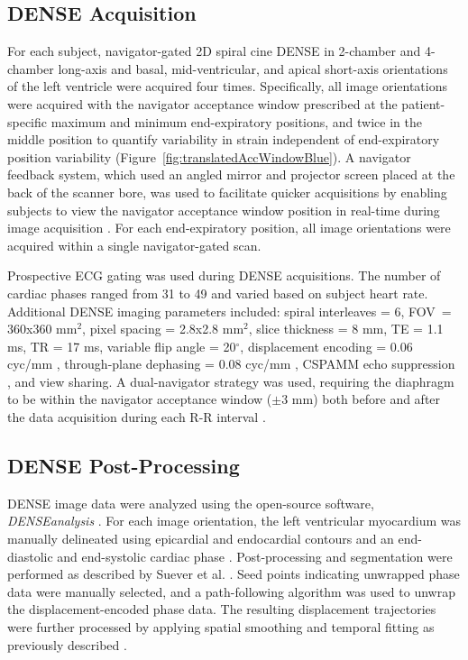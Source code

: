 \subsection{DENSE Acquisition}
	For each subject, navigator-gated 2D spiral cine DENSE in 2-chamber and 4-chamber long-axis and basal, mid-ventricular, and apical short-axis orientations of the left ventricle were acquired four times. Specifically, all image orientations were acquired with the navigator acceptance window prescribed at the patient-specific maximum and minimum end-expiratory positions, and twice in the middle position to quantify variability in strain independent of end-expiratory position variability (Figure~\ref{fig:translatedAccWindowBlue}). A navigator feedback system, which used an angled mirror and projector screen placed at the back of the scanner bore, was used to facilitate quicker acquisitions by enabling subjects to view the navigator acceptance window position in real-time during image acquisition \cite{Hamlet2016a}. For each end-expiratory position, all image orientations were acquired within a single navigator-gated scan.
	
	Prospective ECG gating was used during DENSE acquisitions. The number of cardiac phases ranged from 31 to 49 and varied based on subject heart rate. Additional DENSE imaging parameters included: spiral interleaves = 6, FOV~=~ 360x360 mm$^2$, pixel spacing = 2.8x2.8 mm$^2$, slice thickness = 8 mm, TE = 1.1 ms, TR = 17 ms, variable flip angle = 20$^{\circ}$, displacement encoding = 0.06 cyc/mm \cite{Wehner2015a}, through-plane dephasing = 0.08 cyc/mm \cite{Zhong2006a}, CSPAMM echo suppression \cite{Kim2004}, and view sharing. A dual-navigator strategy was used, requiring the diaphragm to be within the navigator acceptance window ($\pm$3 mm) both before and after the data acquisition during each R-R interval \cite{Hamlet2016}.
	
\subsection{DENSE Post-Processing}
	DENSE image data were analyzed using the open-source software, \textit{DENSEanalysis} \cite{Gilliam2016a}. For each image orientation, the left ventricular myocardium was manually delineated using epicardial and endocardial contours and an end-diastolic and end-systolic cardiac phase \cite{Suever2014}. Post-processing and segmentation were performed as described by Suever et al. \cite{Suever2014}. Seed points indicating unwrapped phase data were manually selected, and a path-following algorithm was used to unwrap the displacement-encoded phase data. The resulting displacement trajectories were further processed by applying spatial smoothing and temporal fitting as previously described \cite{Spottiswoode2007}.
	
